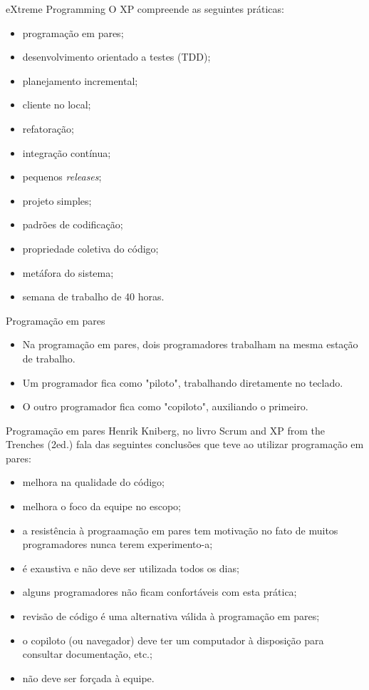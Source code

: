 \documentclass[11pt]{beamer}
\begin{document}
    \begin{frame}{eXtreme Programming}
      O XP compreende as seguintes práticas:
      \begin{itemize}
        \item programação em pares;
        \item desenvolvimento orientado a testes (TDD);
        \item planejamento incremental;
        \item cliente no local;
        \item refatoração;
        \item integração contínua;
        \item pequenos \textit{releases};
        \item projeto simples;
        \item padrões de codificação;
        \item propriedade coletiva do código;
        \item metáfora do sistema;
        \item semana de trabalho de 40 horas.
      \end{itemize}
    \end{frame}

    \begin{frame}{Programação em pares}
      \begin{itemize}
         \item Na programação em pares, dois programadores trabalham na mesma estação de trabalho.
         \item Um programador fica como "piloto", trabalhando diretamente no teclado.
         \item O outro programador fica como "copiloto", auxiliando o primeiro.
      \end{itemize}
    \end{frame}

    \begin{frame}{Programação em pares}
      Henrik Kniberg, no livro Scrum and XP from the Trenches (2ed.) fala das seguintes conclusões que teve ao utilizar programação em pares:
      \begin{itemize}
         \item melhora na qualidade do código;
         \item melhora o foco da equipe no escopo;
         \item a resistência à prograamação em pares tem motivação no fato de muitos programadores nunca terem experimento-a;
         \item é exaustiva e não deve ser utilizada todos os dias;
         \item alguns programadores não ficam confortáveis com esta prática;
         \item revisão de código é uma alternativa válida à programação em pares;
         \item o copiloto (ou navegador) deve ter um computador à disposição para consultar documentação, etc.;
         \item não deve ser forçada à equipe.
      \end{itemize}
    \end{frame}
\end{document}
